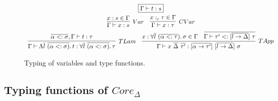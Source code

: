 \documentclass[11pt]{article}
\newcommand{\mathframebox}[1]{\framebox{$\displaystyle #1$}}
\newcommand{\ap}{~}
\begin{document}
    \begin{figure}
        \begin{gather*}
            \mathframebox{\Gamma\vdash t : s} \\
            \begin{array}{ccc}
                \infer[Var]{\Gamma\vdash x : s}{x : s \in \Gamma} &
                \infer[CVar]{\Gamma\vdash x : \tau}{x :_c \tau \in \Gamma}
            \end{array} \\
            \begin{array}{cc}
                \infer[TLam]{
                    \Gamma\vdash\Lambda\overline{l}\ap\overline{(\alpha <: \sigma)}\ldotp t : \forall\overline{l}\ap\overline{(\alpha <: \sigma)}\ldotp\tau
                }{
                    \overline{\alpha <: \sigma}, \Gamma\vdash t : \tau
                } &
                \infer[TApp]{
                    \Gamma\vdash x\ap\overline{\Delta}\ap\overline{\tau'} : [\overline{\alpha\to\tau'}]\ap[\overline{l\to\Delta}]\ap\sigma
                }{
                    x : \forall\overline{l}\ap(\overline{\alpha <: \tau})\ldotp \sigma \in \Gamma
                    &
                    \overline{\Gamma\vdash\tau' <: [\overline{l\to\Delta}]\ap\tau}
                }
            \end{array}
        \end{gather*}
        \caption{Typing of variables and type functions.}
    \end{figure}

    \subsection{Typing functions of $Core_\Delta$}
\end{document}
